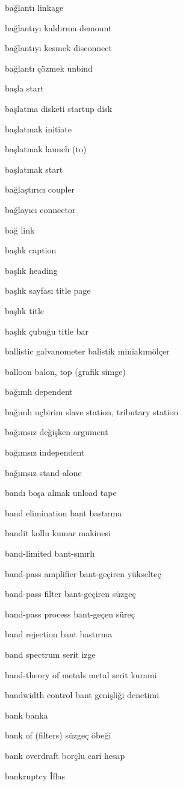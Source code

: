 \documentclass[12pt,fleqn]{article}\usepackage{../../common}
\begin{document}
bağlantı linkage

bağlantıyı kaldırma demount

bağlantıyı kesmek disconnect

bağlantı çözmek unbind

başla start

başlatma disketi startup disk

başlatmak initiate

başlatmak launch (to)

başlatmak start

bağlaştırıcı coupler

bağlayıcı connector

bağ link

başlık caption

başlık heading

başlık sayfası title page

başlık title

başlık çubuğu title bar

ballistic galvanometer balistik miniakımölçer

balloon balon, top (grafik simge)

bağımlı dependent

bağımlı uçbirim slave station, tributary station

bağımsız değişken argument

bağımsız independent

bağımsız stand-alone

bandı boşa almak unload tape

band elimination bant bastırma

bandit kollu kumar makinesi

band-limited bant-sınırlı

band-pass amplifier bant-geçiren yükselteç

band-pass filter bant-geçiren süzgeç

band-pass process bant-geçen süreç

band rejection bant bastırma

band spectrum serit izge

band-theory of metals metal serit kurami

bandwidth control bant genişliği denetimi

bank banka

bank of (filters) süzgeç öbeği

bank overdraft borçlu cari hesap

bankruptcy İflas
\end{document}
